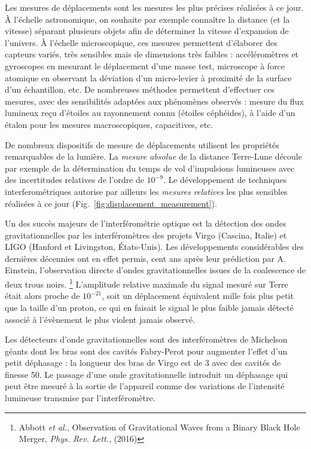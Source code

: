 \documentclass[12pt,a4paper]{article}
\begin{document}
Les mesures de déplacements sont les mesures les plus précises réalisées à ce jour.
À l'échelle astronomique, on souhaite par exemple connaître la distance (et la vitesse) séparant plusieurs objets afin de déterminer la vitesse d'expansion de l'univers.
À l'échelle microscopique, ces mesures permettent d'élaborer des capteurs variés, très sensibles mais de dimensions très faibles : accéléromètres et gyroscopes en mesurant le déplacement d'une masse test, microscope à force atomique en observant la déviation d'un micro-levier à proximité de la surface d'un échantillon, etc.
De nombreuses méthodes permettent d'effectuer ces mesures, avec des sensibilités adaptées aux phénomènes observés : mesure du flux lumineux reçu d'étoiles au rayonnement connu (étoiles céphéides), à l'aide d'un étalon pour les mesures macroscopiques, capacitives, etc.
 
De nombreux dispositifs de mesure de déplacements utilisent les propriétés remarquables de la lumière.
La \textit{mesure absolue} de la distance Terre-Lune découle par exemple de la détermination du temps de vol d'impulsions lumineuses avec des incertitudes relatives de l'ordre de $10^{-9}$.
Le développement de techniques interferométriques autorise par ailleurs les \textit{mesures relatives} les plus sensibles réalisées à ce jour (Fig.~\ref{fig:displacement_measurement}).

Un des succès majeurs de l'interférométrie optique est la détection des ondes gravitationnelles par les interféromètres des projets Virgo (Cascina, Italie) et LIGO (Hanford et Livingston, États-Unis).
Les développements considérables des dernières décennies ont en effet permis, cent ans après leur prédiction par A. Einstein, l'observation directe d'ondes gravitationnelles issues de la coalescence de deux trous noirs.
\footnote{Abbott \textit{et al.}, Observation of Gravitational Waves from a Binary Black Hole Merger, \textit{Phys. Rev. Lett.}, (2016)}
L'amplitude relative maximale du signal mesuré sur Terre était alors proche de $10^{-21}$, soit un déplacement équivalent mille fois plus petit que la taille d'un proton, ce qui en faisait le signal le plus faible jamais détecté associé à l'évènement le plus violent jamais observé.

Les détecteurs d'onde gravitationnelles sont des interféromètres de Michelson géants dont les bras sont des cavités Fabry-Perot pour augmenter l'effet d'un petit déphasage : la longueur des bras de Virgo est de \unit{3}{\kilo\meter} avec des cavités de finesse 50.
Le passage d'une onde gravitationnelle introduit un déphasage qui peut être mesuré à la sortie de l'appareil comme des variations de l'intensité lumineuse transmise par l'interféromètre.
\end{document}
